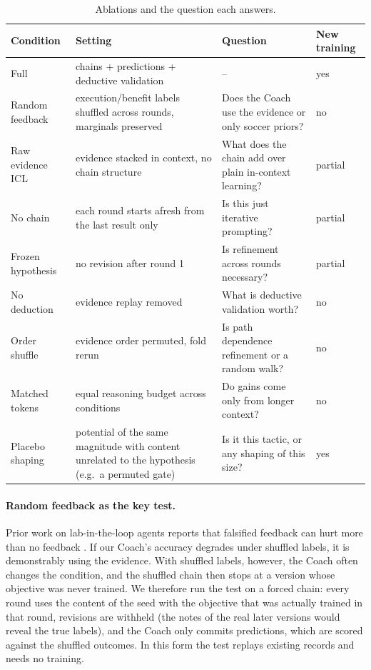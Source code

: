 \documentclass[11pt]{article}
\begin{document}
\begin{table}[t]
\centering\small
\caption{Ablations and the question each answers.}
\label{tab:ablations}
\begin{tabularx}{\linewidth}{@{}l X X l@{}}
\toprule
Condition & Setting & Question & New training \\
\midrule
Full & chains + predictions + deductive validation & -- & yes \\
Random feedback & execution/benefit labels shuffled across rounds, marginals preserved & Does the Coach use the evidence or only soccer priors? & no \\
Raw evidence ICL & evidence stacked in context, no chain structure & What does the chain add over plain in-context learning? & partial \\
No chain & each round starts afresh from the last result only & Is this just iterative prompting? & partial \\
Frozen hypothesis & no revision after round 1 & Is refinement across rounds necessary? & partial \\
No deduction & evidence replay removed & What is deductive validation worth? & no \\
Order shuffle & evidence order permuted, fold rerun & Is path dependence refinement or a random walk? & no \\
Matched tokens & equal reasoning budget across conditions & Do gains come only from longer context? & no \\
Placebo shaping & potential of the same magnitude with content unrelated to the hypothesis (e.g.\ a permuted gate) & Is it this tactic, or any shaping of this size? & yes \\
\bottomrule
\end{tabularx}
\end{table}

\paragraph{Random feedback as the key test.}
Prior work on lab-in-the-loop agents reports that falsified feedback can hurt more than no feedback \citep{labloop2026}.
If our Coach's accuracy degrades under shuffled labels, it is demonstrably using the evidence.
With shuffled labels, however, the Coach often changes the condition, and the shuffled chain then stops at a version whose objective was never trained.
We therefore run the test on a forced chain: every round uses the content of the seed with the objective that was actually trained in that round, revisions are withheld (the notes of the real later versions would reveal the true labels), and the Coach only commits predictions, which are scored against the shuffled outcomes.
In this form the test replays existing records and needs no training.
\end{document}
